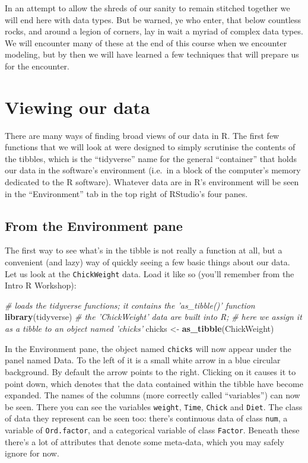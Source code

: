 \documentclass[english,10pt,a4paper,oneside]{book}
\newenvironment{Shaded}{\begin{snugshade}}{\end{snugshade}}
\newcommand{\CommentTok}[1]{\textcolor[rgb]{0.56,0.35,0.01}{\textit{#1}}}
\newcommand{\KeywordTok}[1]{\textcolor[rgb]{0.13,0.29,0.53}{\textbf{#1}}}
\newcommand{\NormalTok}[1]{#1}
\newcommand{\StringTok}[1]{\textcolor[rgb]{0.31,0.60,0.02}{#1}}
\theoremstyle{definition}
\theoremstyle{definition}
\theoremstyle{definition}
\theoremstyle{remark}
\begin{document}
In an attempt to allow the shreds of our sanity to remain stitched
together we will end here with data types. But be warned, ye who enter,
that below countless rocks, and around a legion of corners, lay in wait
a myriad of complex data types. We will encounter many of these at the
end of this course when we encounter modeling, but by then we will have
learned a few techniques that will prepare us for the encounter.

\hypertarget{viewing-our-data}{%
\section{Viewing our data}\label{viewing-our-data}}

There are many ways of finding broad views of our data in R. The first
few functions that we will look at were designed to simply scrutinise
the contents of the tibbles, which is the \enquote{tidyverse} name for
the general \enquote{container} that holds our data in the software's
environment (i.e.~in a block of the computer's memory dedicated to the R
software). Whatever data are in R's environment will be seen in the
\enquote{Environment} tab in the top right of RStudio's four panes.

\hypertarget{from-the-environment-pane}{%
\subsection{From the Environment pane}\label{from-the-environment-pane}}

The first way to see what's in the tibble is not really a function at
all, but a convenient (and lazy) way of quickly seeing a few basic
things about our data. Let us look at the \texttt{ChickWeight} data.
Load it like so (you'll remember from the Intro R Workshop):

\begin{Shaded}
\begin{Highlighting}[]
\CommentTok{# loads the tidyverse functions; it contains the 'as_tibble()' function}
\KeywordTok{library}\NormalTok{(tidyverse)}
\CommentTok{# the 'ChickWeight' data are built into R;}
\CommentTok{# here we assign it as a tibble to an object named 'chicks'}
\NormalTok{chicks <-}\StringTok{ }\KeywordTok{as_tibble}\NormalTok{(ChickWeight)}
\end{Highlighting}
\end{Shaded}

In the Environment pane, the object named \texttt{chicks} will now
appear under the panel named Data. To the left of it is a small white
arrow in a blue circular background. By default the arrow points to the
right. Clicking on it causes it to point down, which denotes that the
data contained within the tibble have become expanded. The names of the
columns (more correctly called \enquote{variables}) can now be seen.
There you can see the variables \texttt{weight}, \texttt{Time},
\texttt{Chick} and \texttt{Diet}. The class of data they represent can
be seen too: there's continuous data of class \texttt{num}, a variable
of \texttt{Ord.factor}, and a categorical variable of class
\texttt{Factor}. Beneath these there's a lot of attributes that denote
some meta-data, which you may safely ignore for now.
\end{document}
